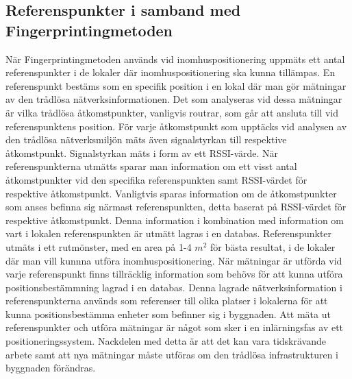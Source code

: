 \documentclass[swedish, a4paper,12pt]{article}
\begin{document}
\subsection{Referenspunkter i samband med Fingerprintingmetoden}\label{referenspunkter}
När Fingerprintingmetoden används vid inomhuspositionering uppmäts ett antal referenspunkter i de lokaler där inomhuspositionering ska kunna tillämpas\cite{yiu2017wireless}\cite{IP1}.
En referenspunkt bestäms som en specifik position i en lokal där man gör mätningar av den trådlösa nätverksinformationen. Det som analyseras vid dessa mätningar är vilka trådlösa åtkomstpunkter, vanligvis routrar, som går att ansluta till vid referenspunktens position. För varje åtkomstpunkt som upptäcks vid analysen av den trådlösa nätverksmiljön mäts även signalstyrkan till respektive åtkomstpunkt. Signalstyrkan mäts i form av ett RSSI-värde. När referenspunkterna utmätts sparar man information om ett visst antal åtkomstpunkter vid den specifika referenspunkten samt RSSI-värdet för respektive åtkomstpunkt\cite{IP1}. Vanligtvis sparas information om de åtkomstpunkter som anses befinna sig närmast referenspunkten, detta baserat på RSSI-värdet för respektive åtkomstpunkt\cite{IP1}. Denna information i kombination med information om vart i lokalen referenspunkten är utmätt lagras i en databas. Referenspunkter utmäts i ett rutmönster, med en area på 1-4 $m^2$ för bästa resultat\cite{yiu2017wireless}, i de lokaler där man vill kunnna utföra inomhuspositionering\cite{IP1}. När mätningar är utförda vid varje referenspunkt finns tillräcklig information som behövs för att kunna utföra positionsbestämmning lagrad i en databas. Denna lagrade nätverksinformation i referenspunkterna används som referenser till olika platser i lokalerna för att kunna positionsbestämma enheter som befinner sig i byggnaden\cite{yiu2017wireless}\cite{IP1}.
Att mäta ut referenspunkter och utföra mätningar är något som sker i en inlärningsfas av ett positioneringssystem\cite{tian2013fingerprint}. Nackdelen med detta är att det kan vara tidskrävande arbete samt att nya mätningar måste utföras om den trådlösa infrastrukturen i byggnaden förändras\cite{IP1}.
\end{document}
